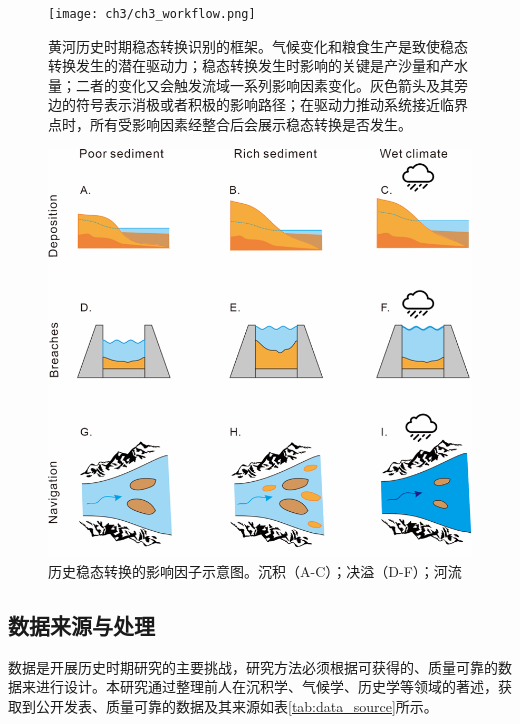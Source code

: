 \begin{figure}[H] %
    \centering
    \texttt{[image: ch3/ch3\_workflow.png]}
    \caption[黄河历史时期稳态转换识别的框架。]{黄河历史时期稳态转换识别的框架。气候变化和粮食生产是致使稳态转换发生的潜在驱动力；稳态转换发生时影响的关键是产沙量和产水量；二者的变化又会触发流域一系列影响因素变化。灰色箭头及其旁边的符号表示消极或者积极的影响路径；在驱动力推动系统接近临界点时，所有受影响因素经整合后会展示稳态转换是否发生。}
    \label{fig:ch3_regime_shift_detect}
\end{figure}

\begin{figure}[H] %
    \centering
    \includegraphics{img/ch3/ch3_impacts.png}
    \caption{历史稳态转换的影响因子示意图。沉积（A-C）；决溢（D-F）；河流}
    \label{fig:ch3_impacts}
\end{figure}

\subsection{数据来源与处理}

数据是开展历史时期研究的主要挑战，研究方法必须根据可获得的、质量可靠的数据来进行设计。本研究通过整理前人在沉积学、气候学、历史学等领域的著述，获取到公开发表、质量可靠的数据及其来源如表\ref{tab:data_source}所示。

